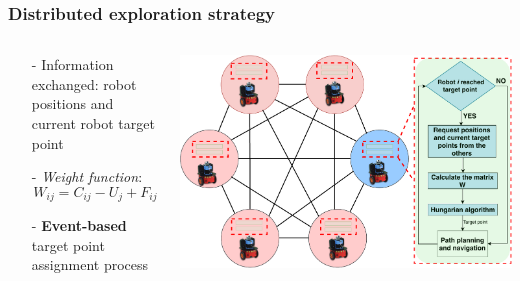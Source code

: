 \begin{frame}
	\frametitle{Distributed exploration strategy}
		\begin{columns}
			\begin{column}{0.5\textwidth}
				\begin{itemize}
					\item[-] Information exchanged: robot positions and current robot target point 
					\item[-]  \textit{Weight function}: 
					\begin{equation}
					{W}_{ij}= {C_{ij}} - {U_{j}} + {F_{ij}}
					\label{weight}
					\end{equation}
					\item[-] \textbf{Event-based} target point assignment process  
				\end{itemize}
			\end{column}
			\begin{column}{0.5\textwidth}  %
				\begin{center}
					\includegraphics[width=1\textwidth]{figures/struktura_vol3}
					\label{fig:gauss}
				\end{center}
			\end{column}
		\end{columns}	
\end{frame}

